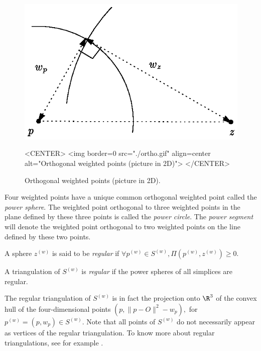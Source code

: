 \begin{figure}[htbp]
\begin{ccTexOnly}
\begin{center} 
\includegraphics{ortho.eps} 
\end{center}
\end{ccTexOnly}
\caption{Orthogonal weighted points (picture in 2D).
\label{Triangulation3-fig-ortho}}
\begin{ccHtmlOnly}
<CENTER>
<img border=0 src="./ortho.gif" align=center alt="Orthogonal weighted
points (picture in 2D)"> 
</CENTER>
\end{ccHtmlOnly}
\end{figure} 

Four weighted points have a unique common orthogonal weighted point
called the \textit{power sphere}.  The weighted point orthogonal to
three weighted points in the plane defined by these three points is
called the \textit{power circle}. The
\textit{power segment} will denote the weighted point orthogonal to
two weighted points on the line defined by these two points.

A sphere ${z}^{(w)}$ is said to be
\textit{regular} if $\forall {p}^{(w)}\in{S}^{(w)},
\Pi{({p}^{(w)},{z}^{(w)})}\geq 0$.

A triangulation of ${S}^{(w)}$ is \textit{regular} if the power spheres
of all simplices are regular. 

The regular triangulation of
${S}^{(w)}$ is in fact the projection onto $\R^3$ of the convex hull 
of the four-dimensional points $(p,\|p-O\|^2-w_p),$ for
${p}^{(w)}=(p,w_p)\in{S}^{(w)}$. 
Note that all points of ${S}^{(w)}$ do not
necessarily appear as vertices of the regular
triangulation. To know more about regular triangulations, see for
example \cite{es-itfwr-96}. 

